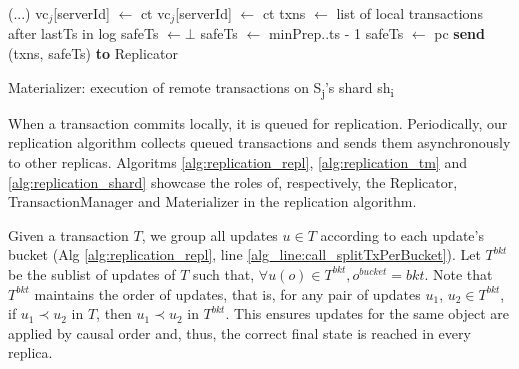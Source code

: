 \documentclass[sigconf, nonacm]{acmart}
\begin{document}
\begin{algorithm}
	\small{
	\begin{algorithmic}[1]
		\Statex \hspace*{1.4em} (...)	
		\State vc$_j$[serverId] $\leftarrow$ ct
		\EndFunction
		\State vc$_j$[serverId] $\leftarrow$ ct
		\EndFunction
			\State txns $\leftarrow$ list of local transactions after lastTs in log
			\State safeTs $\leftarrow \bot$
				\State safeTs $\leftarrow $ minPrep..ts - 1 %
			\Else
				\State safeTs $\leftarrow$ pc
			\EndIf
			\State \textbf{send} (txns, safeTs) \textbf{to} Replicator
		\EndFunction
	\end{algorithmic}
}
	\caption{Materializer: execution of remote transactions on S\textsubscript{j}'s shard sh\textsubscript{i}}
	\label{alg:replication_shard}
\end{algorithm}

When a transaction commits locally, it is queued for replication.
Periodically, our replication algorithm collects queued transactions and sends them asynchronously to other replicas.
Algoritms \ref{alg:replication_repl}, \ref{alg:replication_tm} and \ref{alg:replication_shard} showcase the roles of, respectively, the Replicator, TransactionManager and Materializer in the replication algorithm.


Given a transaction $T$, we group all updates $u \in T$ according to each update's bucket (Alg \ref{alg:replication_repl}, line \ref{alg_line:call_splitTxPerBucket}).
Let $T^{bkt}$ be the sublist of updates of $T$ such that, $\forall u(o) \in T^{bkt}, o^{bucket} = bkt$.
Note that $T^{bkt}$ maintains the order of updates, that is, for any pair of updates $u_1$, $u_2 \in T^{bkt}$, if $u_1 \prec u_2$ in $T$, then $u_1 \prec u_2$ in $T^{bkt}$.
This ensures updates for the same object are applied by causal order and, thus, the correct final state is reached in every replica.
\end{document}
